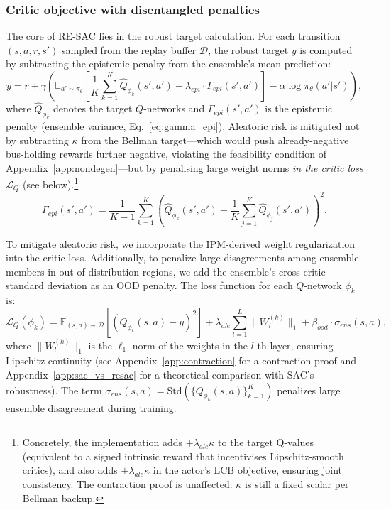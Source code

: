 \documentclass[10pt]{article}
\begin{document}
\subsubsection{Critic objective with disentangled penalties}
The core of RE-SAC lies in the robust target calculation. For each transition $(s, a, r, s')$ sampled from the replay buffer $\mathcal{D}$, the robust target $y$ is computed by subtracting the epistemic penalty from the ensemble's mean prediction:
\begin{equation}
    y = r + \gamma \left( \mathbb{E}_{a' \sim \pi_\theta} \left[ \frac{1}{K} \sum_{k=1}^K \hat{Q}_{\phi_k}(s', a') - \lambda_{epi} \cdot \Gamma_{epi}(s', a') \right] - \alpha \log \pi_\theta(a'|s') \right),
    \label{eq:target_y}
\end{equation}
where $\hat{Q}_{\phi_k}$ denotes the target $Q$-networks and $\Gamma_{epi}(s', a')$ is the epistemic penalty (ensemble variance, Eq.~\eqref{eq:gamma_epi}).
Aleatoric risk is mitigated not by subtracting $\kappa$ from the Bellman target---which would push already-negative bus-holding rewards further negative, violating the feasibility condition of Appendix~\ref{app:nondegen}---but by penalising large weight norms \emph{in the critic loss} $\mathcal{L}_Q$ (see below).\footnote{Concretely, the implementation adds $+\lambda_{ale}\kappa$ to the target Q-values (equivalent to a signed intrinsic reward that incentivises Lipschitz-smooth critics), and also adds $+\lambda_{ale}\kappa$ in the actor's LCB objective, ensuring joint consistency. The contraction proof is unaffected: $\kappa$ is still a fixed scalar per Bellman backup.}
\begin{equation}
    \Gamma_{epi}(s', a') = \frac{1}{K-1} \sum_{k=1}^K \left( \hat{Q}_{\phi_k}(s', a') - \frac{1}{K} \sum_{j=1}^K \hat{Q}_{\phi_j}(s', a') \right)^2.
\end{equation}

To mitigate aleatoric risk, we incorporate the IPM-derived weight regularization into the critic loss. Additionally, to penalize large disagreements among ensemble members in out-of-distribution regions, we add the ensemble's cross-critic standard deviation as an OOD penalty. The loss function for each $Q$-network $\phi_k$ is:
\begin{equation}
    \mathcal{L}_Q(\phi_k) = \mathbb{E}_{(s,a) \sim \mathcal{D}} \left[ \left( Q_{\phi_k}(s, a) - y \right)^2 \right] + \lambda_{ale} \sum_{l=1}^L \|W_{l}^{(k)}\|_1 + \beta_{ood} \cdot \sigma_{ens}(s, a),
\end{equation}
where $\|W_{l}^{(k)}\|_1$ is the $\ell_1$-norm of the weights in the $l$-th layer, ensuring Lipschitz continuity (see Appendix~\ref{app:contraction} for a contraction proof and Appendix~\ref{app:sac_vs_resac} for a theoretical comparison with SAC's robustness). The term $\sigma_{ens}(s, a) = \text{Std}(\{Q_{\phi_k}(s, a)\}_{k=1}^K)$ penalizes large ensemble disagreement during training.
\end{document}
